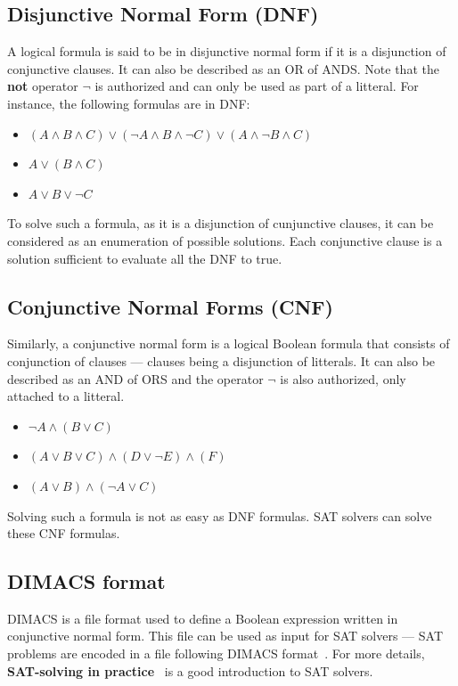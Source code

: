 \subsection{Disjunctive Normal Form (DNF)}
A logical formula is said to be in disjunctive normal form if it is a disjunction of conjunctive clauses.
It can also be described as an OR of ANDS. Note that the \textbf{not} operator $\neg$ is authorized and can
only be used as part of a litteral. For instance, the
following formulas are in DNF:
\begin{itemize}
 \item $(A \land B \land C) \lor (\neg A \land B \land \neg C) \lor (A \land \neg B \land C)$
 \item $A \lor (B \land C)$
 \item $A \lor B \lor \neg C$
\end{itemize}
To solve such a formula, as it is a disjunction of cunjunctive clauses, it can be considered as an
enumeration of possible solutions. Each conjunctive clause is a solution sufficient to evaluate all the DNF
to true.

\subsection{Conjunctive Normal Forms (CNF)}
Similarly, a conjunctive normal form is a logical Boolean formula that consists of conjunction of clauses
--- clauses being a disjunction of litterals. It can also be described as an AND of ORS and the operator
$\neg$ is also authorized, only attached to a litteral.
\begin{itemize}
 \item $\neg A \land (B \lor C)$
 \item $(A \lor B \lor C) \land (D \lor \neg E) \land (F)$
 \item $ (A \lor B) \land (\neg A \lor C) $
\end{itemize}
Solving such a formula is not as easy as DNF formulas. SAT solvers can solve these CNF formulas.

\subsection{DIMACS format}
DIMACS is a file format used to define a Boolean expression written in conjunctive normal form. This file
can be used as input for SAT solvers --- SAT problems are encoded in a file following DIMACS
format~\cite{18}. For more details, \textbf{SAT-solving in practice}~\cite{16} is a good introduction to
SAT solvers.
